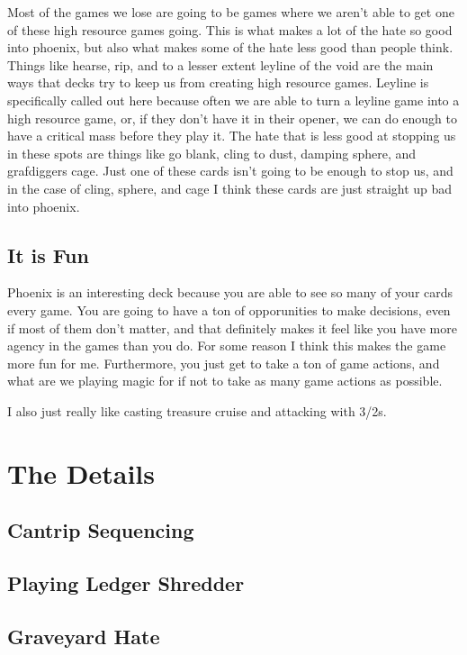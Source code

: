 \documentclass[12pt]{article}
\begin{document}
Most of the games we lose are going to be games where we aren't able to get one of these high resource games going. This is what makes a lot of the hate so good into phoenix, but also what makes some of the hate less good than people think. Things like hearse, rip, and to a lesser extent leyline of the void are the main ways that decks try to keep us from creating high resource games. Leyline is specifically called out here because often we are able to turn a leyline game into a high resource game, or, if they don't have it in their opener, we can do enough to have a critical mass before they play it. The hate that is less good at stopping us in these spots are things like go blank, cling to dust, damping sphere, and grafdiggers cage. Just one of these cards isn't going to be enough to stop us, and in the case of cling, sphere, and cage I think these cards are just straight up bad into phoenix.

\subsection{It is Fun}
Phoenix is an interesting deck because you are able to see so many of your cards every game. You are going to have a ton of opporunities to make decisions, even if most of them don't matter, and that definitely makes it feel like you have more agency in the games than you do. For some reason I think this makes the game more fun for me. Furthermore, you just get to take a ton of game actions, and what are we playing magic for if not to take as many game actions as possible.

\vspace{0.4em}
\noindent I also just really like casting treasure cruise and attacking with 3/2s.

\clearpage
\section{The Details}
\subsection{Cantrip Sequencing}

\subsection{Playing Ledger Shredder}

\subsection{Graveyard Hate}
\end{document}
